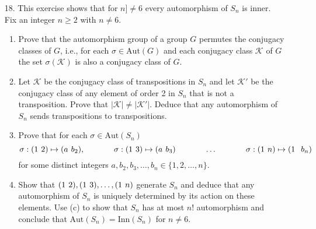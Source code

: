 \documentclass[12pt,leqno]{book}
\theoremstyle{definition}
\newenvironment{Proof}{\begin{proof}[\textnormal{\textbf{Proof}}]}{\end{proof}}
\begin{document}
\begin{enumerate}
\begin{Proof}
\end{Proof}

 \item [18.] This exercise shows that for $n]\not=6$ every automorphism of $S_n$ is inner. Fix an integer $n\geq2$ with $n\not=6$.
\begin{enumerate}
 \item Prove that the automorphism group of a group $G$ permutes the conjugacy classes of $G$, i.e., for each $\sigma\in\text{Aut}(G)$ and each conjugacy class $\mathcal{K}$ of $G$ the set $\sigma(\mathcal{K})$ is also a conjugacy class of $G$.
\item Let $\mathcal{K}$ be the conjugacy class of transpositions in $S_n$ and let $\mathcal{K}'$ be the conjugacy class of any element of order 2 in $S_n$ that is not a transposition. Prove that $|\mathcal{K}|\not=|\mathcal{K}'|$. Deduce that any automorphism of $S_n$ sends transpositions to transpositions.
\item Prove that for each $\sigma\in\text{Aut}(S_n)$ \[\sigma:(1\hskip.05in 2)\mapsto(a\hskip.05in b_2),\hskip.5in\sigma:(1\hskip.05in 3)\mapsto(a\hskip.05in b_3)\hskip.5in\hdots\hskip.5in\sigma:(1\hskip.05in n)\mapsto(1\hskip.1in b_n)\] for some distinct integers $a,b_2,b_3,\hdots,b_n\in\{1,2,\hdots,n\}$.
\item Show that $(1\hskip.05in 2),(1\hskip.05in 3),\hdots,(1\hskip.05in n)$ generate $S_n$ and deduce that any automorphism of $S_n$ is uniquely determined by its action on these elements. Use (c) to show that $S_n$ has at most $n!$ automorphism and conclude that $\text{Aut}(S_n)=\text{Inn}(S_n)$ for $n\not=6$.
\end{enumerate}


\end{enumerate}
\end{document}
